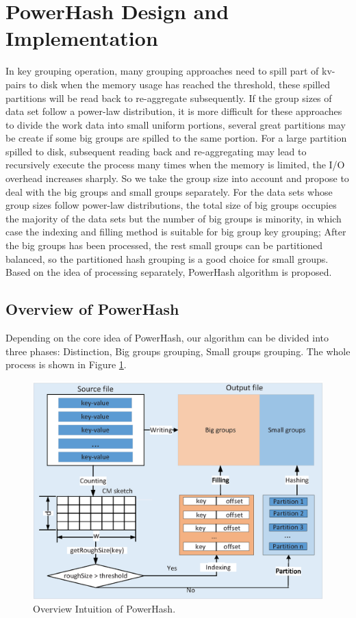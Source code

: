 \section{PowerHash Design and Implementation}
\label{sec:hash}

In key grouping operation, many grouping approaches need to spill part of kv-pairs to disk when the memory usage has reached the threshold, these spilled partitions will be read back to re-aggregate subsequently. If the group sizes of data set follow a power-law distribution, 
it is more difficult for these approaches to divide the work data into small uniform portions, several great partitions may be create if some big groups are spilled to the same portion. For a large partition spilled to disk, subsequent reading back and re-aggregating may lead to recursively execute the process many times when the memory is limited, the I/O overhead increases sharply. So we take the group size into account and propose to deal with the big groups and small groups separately. For the data sets whose group sizes follow power-law distributions, the total size of big groups occupies the majority of the data sets but the number of big groups is minority, in which case
the indexing and filling method is suitable for big group key grouping; After the big groups has been processed, the rest small groups can be partitioned balanced, so the partitioned hash grouping is a good choice for small groups. Based on the idea of processing separately, PowerHash algorithm is proposed. 

\subsection{Overview of PowerHash}%
Depending on the core idea of PowerHash, our algorithm can be divided into three phases: Distinction, Big groups grouping, Small groups grouping. The whole process is shown in Figure \ref{fig:pwHash}.
\begin{figure}
\includegraphics[width=.48\textwidth]{fig/pwhash}
\caption{Overview Intuition of PowerHash.}
\label{fig:pwHash}
\end{figure}

